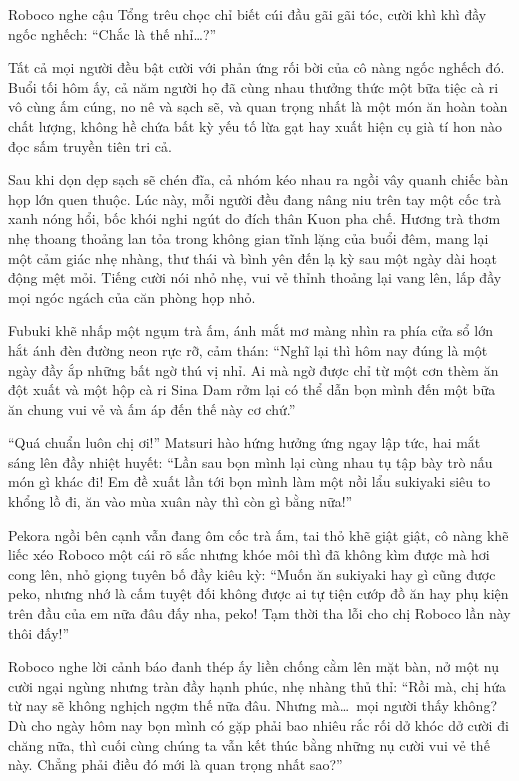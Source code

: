 \documentclass[../main.tex]{subfiles}
\begin{document}
Roboco nghe cậu Tổng trêu chọc chỉ biết cúi đầu gãi gãi tóc, cười khì khì đầy ngốc nghếch: ``Chắc là thế nhỉ\dots?''

Tất cả mọi người đều bật cười với phản ứng rối bời của cô nàng ngốc nghếch đó. Buổi tối hôm ấy, cả năm người họ đã cùng nhau thưởng thức một bữa tiệc cà ri vô cùng ấm cúng, no nê và sạch sẽ, và quan trọng nhất là một món ăn hoàn toàn chất lượng, không hề chứa bất kỳ yếu tố lừa gạt hay xuất hiện cụ già tí hon nào đọc sấm truyền tiên tri cả.

\ct

Sau khi dọn dẹp sạch sẽ chén đĩa, cả nhóm kéo nhau ra ngồi vây quanh chiếc bàn họp lớn quen thuộc. Lúc này, mỗi người đều đang nâng niu trên tay một cốc trà xanh nóng hổi, bốc khói nghi ngút do đích thân Kuon pha chế. Hương trà thơm nhẹ thoang thoảng lan tỏa trong không gian tĩnh lặng của buổi đêm, mang lại một cảm giác nhẹ nhàng, thư thái và bình yên đến lạ kỳ sau một ngày dài hoạt động mệt mỏi. Tiếng cười nói nhỏ nhẹ, vui vẻ thỉnh thoảng lại vang lên, lấp đầy mọi ngóc ngách của căn phòng họp nhỏ.

Fubuki khẽ nhấp một ngụm trà ấm, ánh mắt mơ màng nhìn ra phía cửa sổ lớn hắt ánh đèn đường neon rực rỡ, cảm thán: ``Nghĩ lại thì hôm nay đúng là một ngày đầy ắp những bất ngờ thú vị nhỉ. Ai mà ngờ được chỉ từ một cơn thèm ăn đột xuất và một hộp cà ri Sina Dam rởm lại có thể dẫn bọn mình đến một bữa ăn chung vui vẻ và ấm áp đến thế này cơ chứ.''

``Quá chuẩn luôn chị ơi!'' Matsuri hào hứng hưởng ứng ngay lập tức, hai mắt sáng lên đầy nhiệt huyết: ``Lần sau bọn mình lại cùng nhau tụ tập bày trò nấu món gì khác đi! Em đề xuất lần tới bọn mình làm một nồi lẩu sukiyaki siêu to khổng lồ đi, ăn vào mùa xuân này thì còn gì bằng nữa!''

Pekora ngồi bên cạnh vẫn đang ôm cốc trà ấm, tai thỏ khẽ giật giật, cô nàng khẽ liếc xéo Roboco một cái rõ sắc nhưng khóe môi thì đã không kìm được mà hơi cong lên, nhỏ giọng tuyên bố đầy kiêu kỳ: ``Muốn ăn sukiyaki hay gì cũng được peko, nhưng nhớ là cấm tuyệt đối không được ai tự tiện cướp đồ ăn hay phụ kiện trên đầu của em nữa đâu đấy nha, peko! Tạm thời tha lỗi cho chị Roboco lần này thôi đấy!''

Roboco nghe lời cảnh báo đanh thép ấy liền chống cằm lên mặt bàn, nở một nụ cười ngại ngùng nhưng tràn đầy hạnh phúc, nhẹ nhàng thủ thỉ: ``Rồi mà, chị hứa từ nay sẽ không nghịch ngợm thế nữa đâu. Nhưng mà\dots\ mọi người thấy không? Dù cho ngày hôm nay bọn mình có gặp phải bao nhiêu rắc rối dở khóc dở cười đi chăng nữa, thì cuối cùng chúng ta vẫn kết thúc bằng những nụ cười vui vẻ thế này. Chẳng phải điều đó mới là quan trọng nhất sao?''
\end{document}
